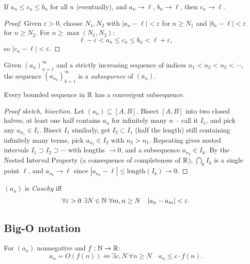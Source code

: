 \documentclass[11pt]{article}
\begin{document}
\bigskip
\begin{theorem}
If $a_n\le c_n\le b_n$ for all $n$ (eventually), and $a_n\to\ell$, $b_n\to\ell$, then $c_n\to\ell$.
\end{theorem}
\begin{proof}
Given $\varepsilon>0$, choose $N_1,N_2$ with $|a_n-\ell|<\varepsilon$ for $n\ge N_1$ and $|b_n-\ell|<\varepsilon$ for $n\ge N_2$. For $n\ge\max(N_1,N_2)$:
\[
\ell-\varepsilon < a_n \le c_n \le b_n < \ell+\varepsilon,
\]
so $|c_n-\ell|<\varepsilon$.
\end{proof}

\bigskip
\begin{definition}[Subsequence]
Given $(a_n)_{n=1}^\infty$ and a strictly increasing sequence of indices $n_1<n_2<n_3<\cdots$, the sequence $(a_{n_k})_{k=1}^\infty$ is a \emph{subsequence} of $(a_n)$.
\end{definition}

\begin{theorem}
Every bounded sequence in $\mathbb{R}$ has a convergent subsequence.
\end{theorem}
\begin{proof}[Proof sketch, bisection]
Let $(a_n)\subseteq[A,B]$. Bisect $[A,B]$ into two closed halves; at least one half contains $a_n$ for infinitely many $n$ -- call it $I_1$, and pick any $a_{n_1}\in I_1$. Bisect $I_1$ similarly, get $I_2\subset I_1$ (half the length) still containing infinitely many terms, pick $a_{n_2}\in I_2$ with $n_2>n_1$. Repeating gives nested intervals $I_1\supset I_2\supset\cdots$ with lengths $\to0$, and a subsequence $a_{n_k}\in I_k$. By the Nested Interval Property (a consequence of completeness of $\mathbb{R}$), $\bigcap_k I_k$ is a single point $\ell$, and $a_{n_k}\to\ell$ since $|a_{n_k}-\ell|\le\mathrm{length}(I_k)\to0$.
\end{proof}

\bigskip
\begin{definition}
$(a_n)$ is \emph{Cauchy} iff
\[
\forall\varepsilon>0\ \exists N\in\mathbb{N}\ \forall m,n\ge N\quad |a_n-a_m|<\varepsilon.
\]
\end{definition}

\subsection{Big-O notation}
\label{sec:6-9}

\begin{definition}[Big-O]
For $(a_n)$ nonnegative and $f:\mathbb{N}\to\mathbb{R}$:
\[
a_n = O(f(n)) \iff \exists c,N\ \forall n\ge N\quad a_n \le c\cdot f(n).
\]
\end{definition}
\end{document}

